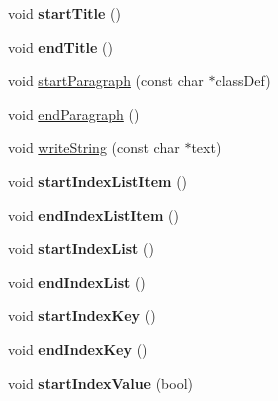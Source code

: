 \begin{DoxyCompactItemize}
\item 
\mbox{\label{class_html_generator_a0fd5a2e848ea16b025b1fb07b4b307fc}} 
void {\bfseries start\+Title} ()
\item 
\mbox{\label{class_html_generator_ae1337adbb5ad6cea03fcee0d5a7cdfce}} 
void {\bfseries end\+Title} ()
\item 
void \mbox{\hyperlink{class_html_generator_ab00abe0fbb8b668d3f8fd73b7c1216b0}{start\+Paragraph}} (const char $\ast$class\+Def)
\item 
void \mbox{\hyperlink{class_html_generator_a48e5516f348a9ec6ed456a6a3b003af3}{end\+Paragraph}} ()
\item 
void \mbox{\hyperlink{class_html_generator_ad54dd4f0dda0e22574149cfb4415ae4a}{write\+String}} (const char $\ast$text)
\item 
\mbox{\label{class_html_generator_a528f8a53cd93274bdbb70c93be532101}} 
void {\bfseries start\+Index\+List\+Item} ()
\item 
\mbox{\label{class_html_generator_a219b3a869630c6155761687cdf8a4965}} 
void {\bfseries end\+Index\+List\+Item} ()
\item 
\mbox{\label{class_html_generator_a72550760e6a0c1c45a5667923b08f736}} 
void {\bfseries start\+Index\+List} ()
\item 
\mbox{\label{class_html_generator_ab387bea7212012b16c44c1a3fdae04e3}} 
void {\bfseries end\+Index\+List} ()
\item 
\mbox{\label{class_html_generator_a61aabe55582849829fd4197d389f5843}} 
void {\bfseries start\+Index\+Key} ()
\item 
\mbox{\label{class_html_generator_a5f89e089a71b9463223efd7ad08a5d37}} 
void {\bfseries end\+Index\+Key} ()
\item 
\mbox{\label{class_html_generator_a5a650d7a723ffd19f31485454ca3d2ff}} 
void {\bfseries start\+Index\+Value} (bool)
\item 
\mbox{\label{class_html_generator_a7693faad26cf924dd428b9ad0d7e95a0}} 

\end{DoxyCompactItemize}
